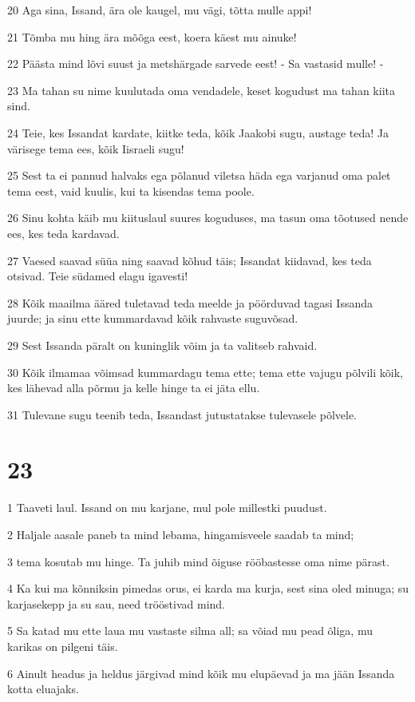 \par 20 Aga sina, Issand, ära ole kaugel, mu vägi, tõtta mulle appi!
\par 21 Tõmba mu hing ära mõõga eest, koera käest mu ainuke!
\par 22 Päästa mind lõvi suust ja metshärgade sarvede eest! - Sa vastasid mulle! -
\par 23 Ma tahan su nime kuulutada oma vendadele, keset kogudust ma tahan kiita sind.
\par 24 Teie, kes Issandat kardate, kiitke teda, kõik Jaakobi sugu, austage teda! Ja värisege tema ees, kõik Iisraeli sugu!
\par 25 Sest ta ei pannud halvaks ega põlanud viletsa häda ega varjanud oma palet tema eest, vaid kuulis, kui ta kisendas tema poole.
\par 26 Sinu kohta käib mu kiituslaul suures koguduses, ma tasun oma tõotused nende ees, kes teda kardavad.
\par 27 Vaesed saavad süüa ning saavad kõhud täis; Issandat kiidavad, kes teda otsivad. Teie südamed elagu igavesti!
\par 28 Kõik maailma ääred tuletavad teda meelde ja pöörduvad tagasi Issanda juurde; ja sinu ette kummardavad kõik rahvaste suguvõsad.
\par 29 Sest Issanda päralt on kuninglik võim ja ta valitseb rahvaid.
\par 30 Kõik ilmamaa võimsad kummardagu tema ette; tema ette vajugu põlvili kõik, kes lähevad alla põrmu ja kelle hinge ta ei jäta ellu.
\par 31 Tulevane sugu teenib teda, Issandast jutustatakse tulevasele põlvele.

\chapter{23}

\par 1 Taaveti laul. Issand on mu karjane, mul pole millestki puudust.
\par 2 Haljale aasale paneb ta mind lebama, hingamisveele saadab ta mind;
\par 3 tema kosutab mu hinge. Ta juhib mind õiguse rööbastesse oma nime pärast.
\par 4 Ka kui ma kõnniksin pimedas orus, ei karda ma kurja, sest sina oled minuga; su karjasekepp ja su sau, need trööstivad mind.
\par 5 Sa katad mu ette laua mu vastaste silma all; sa võiad mu pead õliga, mu karikas on pilgeni täis.
\par 6 Ainult headus ja heldus järgivad mind kõik mu elupäevad ja ma jään Issanda kotta eluajaks.

